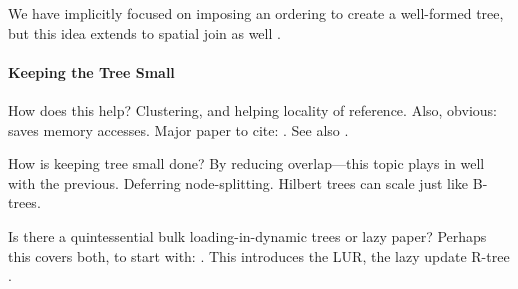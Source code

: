 We have implicitly focused on imposing an ordering to create a well-formed tree, but this idea extends to spatial join as well \cite{jacoxsamet07}.

\paragraph{Keeping the Tree Small}
How does this help?
Clustering, and helping locality of reference.
Also, obvious: saves memory accesses.
Major paper to cite: \cite{huanglinlin01}.
See also \cite{zhanglucheng06}.

How is keeping tree small done?
By reducing overlap---this topic plays in well with the previous.
Deferring node-splitting.
Hilbert trees can scale just like B-trees.

Is there a quintessential bulk loading-in-dynamic trees or lazy paper?
Perhaps this covers both, to start with: \cite{argehinrichsvahrenholdvitter99}.
This introduces the LUR, the lazy update R-tree \cite{kwonleelee02}.


